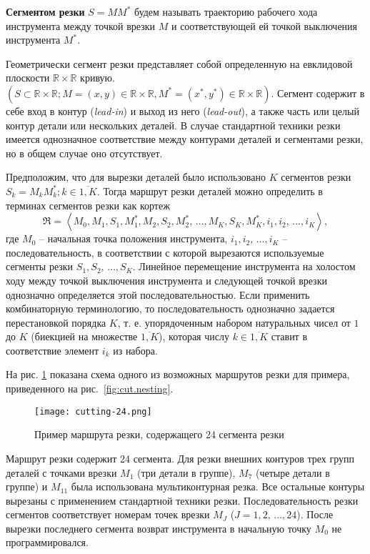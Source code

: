 \begin{opred}
  \label{def:cutting-segment}
  \textbf{Сегментом резки}
  $S=MM^*$
  будем называть траекторию рабочего хода
  инструмента между точкой врезки
  $M$
  и соответствующей ей точкой выключения инструмента
  $M^*$.
\end{opred}
Геометрически сегмент резки представляет собой
определенную на евклидовой плоскости
$\mathbb R \times \mathbb R$
кривую.
$(S \subset \mathbb R \times \mathbb R;
M=(x,y) \in \mathbb R \times \mathbb R,
M^* =(x^*,y^*)\in \mathbb R \times \mathbb R)$.
Сегмент содержит в себе вход в контур
(\textit{lead-in})
и выход из него
(\textit{lead-out}),
а также часть или целый контур детали
или нескольких деталей.
В случае стандартной техники резки
имеется однозначное соответствие между
контурами деталей и сегментами резки,
но в общем случае оно отсутствует.

Предположим, что для вырезки деталей было использовано
$K$
сегментов резки
$S_k=M_kM^*_k; k \in \overline{1,K}$.
Тогда маршрут резки деталей можно определить
в терминах сегментов резки как кортеж
\begin{equation}
  \mathfrak R = \left<
    M_0, M_1, S_1, M_1^*, M_2, S_2, M_2^*, \,\dots, M_K, S_K, M_K^*,
    i_1, i_2, \,\dots, i_K
  \right>
  ,
  \label{tuple}
\end{equation}
где
$M_0$
-- начальная точка положения инструмента,
$i_1, i_2, \,\dots, i_K$
– последовательность, в соответствии с которой вырезаются используемые сегменты резки
$S_1, S_2, \,\dots, S_K$.
Линейное перемещение инструмента на холостом ходу
между точкой выключения инструмента и следующей точкой врезки
однозначно определяется этой последовательностью.
Если применить комбинаторную терминологию,
то последовательность однозначно задается перестановкой порядка
$K$,
т. е. упорядоченным набором натуральных чисел от $1$ до $K$
(биекцией на множестве $\overline{1,K}$),
которая числу
$k \in \overline{1,K}$
ставит в соответствие элемент
$i_k$ из набора.

На рис. \ref{fig:cut.cutting}
показана схема одного из возможных маршрутов резки для примера,
приведенного на рис.~\ref{fig:cut.nesting}.

\begin{figure}
  \centering
  \texttt{[image: cutting-24.png]}
  \caption{
    Пример маршрута резки,
    содержащего 24 сегмента резки
  }
  \label{fig:cut.cutting}
\end{figure}

Маршрут резки содержит 24 сегмента.
Для резки внешних контуров трех групп деталей
с точками врезки $M_1$
(три детали в группе),
$M_7$
(четыре детали в группе) и
$M_{11}$
была использована мультиконтурная резка.
Все остальные контуры вырезаны с применением стандартной техники резки.
Последовательность резки сегментов соответствует
номерам точек врезки $M_J$ ($J=1,2,\,\dots, 24$).
После вырезки последнего сегмента
возврат инструмента в начальную точку $M_0$
не программировался.

